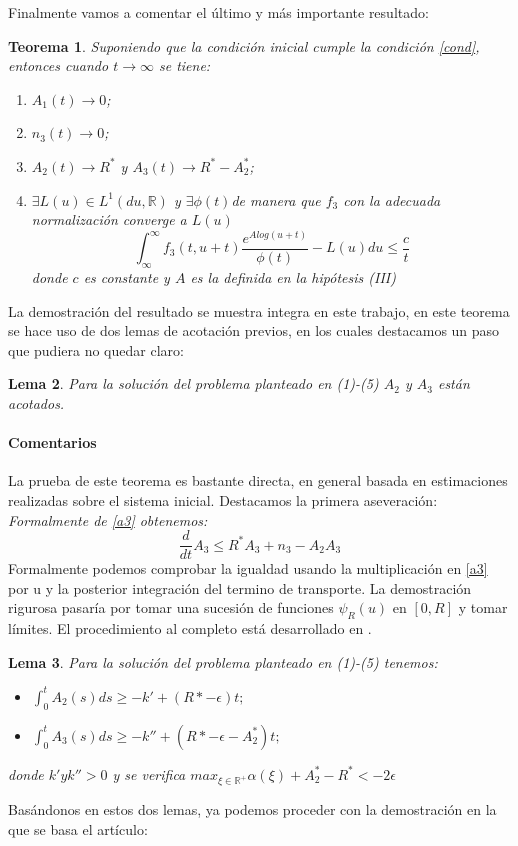 \documentclass[1p]{elsarticle}
\newtheorem{thm}{Teorema}
\newtheorem{lem}[thm]{Lema}
\begin{document}
Finalmente vamos a comentar el último y más importante resultado:
\begin{thm}
	Suponiendo que la condición inicial cumple la condición \ref{cond}, entonces cuando $t\rightarrow\infty$ se tiene:
	\begin{enumerate}
		\item $A_1(t)\rightarrow0$;
		\item $n_3(t)\rightarrow0$;
		\item $A_2(t)\rightarrow R^*$ y $A_3(t)\rightarrow R^*-A_2^*$;
		\item $\exists L(u)\in L^1(du,\mathbb{R})$ y $\exists\phi(t)$de manera que $f_3$ con la adecuada normalización converge a $L(u)$
		$$\int_{\infty}^{\infty}f_3(t,u+t)\frac{e^{Alog(u+t)}}{\phi(t)}-L(u)du\leq\frac{c}{t}$$
		donde $c$ es constante y $A$ es la definida en la hipótesis \textit{(III)}
	\end{enumerate}\label{teorema3}
\end{thm}
La demostración del resultado se muestra integra en este trabajo, en este teorema se hace uso de dos lemas de acotación previos, en los cuales destacamos un paso que pudiera no quedar claro:
\begin{lem}
	Para la solución del problema planteado en (1)-(5) $A_2$ y $A_3$ están acotados.
\end{lem}
 \paragraph{Comentarios}La prueba de este teorema es bastante directa, en general basada en estimaciones realizadas sobre el sistema inicial. Destacamos la primera aseveración: \textit{Formalmente de \ref{a3} obtenemos:}
 $$\frac{d}{dt}A_3\leq R^*A_3+n_3-A_2A_3$$
Formalmente podemos comprobar la igualdad usando la multiplicación en \ref{a3} por u y la posterior integración del termino de transporte. La demostración rigurosa pasaría por tomar una sucesión de funciones $\psi_R(u)$ en $[0,R]$ y tomar límites. El procedimiento al completo está desarrollado en \cite{textolargo}.
\begin{lem}
	Para la solución del problema planteado en (1)-(5) tenemos:
	\begin{itemize}
		\item $\int_{0}^{t}A_2(s)ds\geq-k'+(R*-\epsilon)t; $
		\item $\int_{0}^{t}A_3(s)ds\geq-k''+(R*-\epsilon-A_2^*)t; $
	\end{itemize}
	donde $k' y k''>0$ y se verifica $max_{\xi\in\mathbb{R}^+}\alpha(\xi)+A_2^*-R^*<-2\epsilon$
\end{lem}
Basándonos en estos dos lemas, ya podemos proceder con la demostración en la que se basa el artículo:
\end{document}
